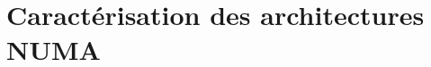 

\chapter{Caractérisation des architectures NUMA}\label{chap:contrib:characterization}
\chaptertoc







